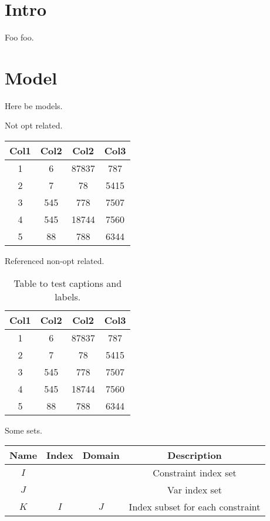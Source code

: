 \documentclass{article}
\begin{document}
\section{Intro}
Foo foo.

\section{Model}
Here be models.

Not opt related.
\begin{center}
    \begin{tabular}{||c c c c||} 
     \hline
     Col1 & Col2 & Col2 & Col3 \\ [0.5ex] 
     \hline\hline
     1 & 6 & 87837 & 787 \\ 
     \hline
     2 & 7 & 78 & 5415 \\
     \hline
     3 & 545 & 778 & 7507 \\
     \hline
     4 & 545 & 18744 & 7560 \\
     \hline
     5 & 88 & 788 & 6344 \\ [1ex] 
     \hline
    \end{tabular}
\end{center}

Referenced non-opt related.
\begin{table}[h!]
    \centering
    \begin{tabular}{||c c c c||} 
     \hline
     Col1 & Col2 & Col2 & Col3 \\ [0.5ex] 
     \hline\hline
     1 & 6 & 87837 & 787 \\ 
     2 & 7 & 78 & 5415 \\
     3 & 545 & 778 & 7507 \\
     4 & 545 & 18744 & 7560 \\
     5 & 88 & 788 & 6344 \\ [1ex] 
     \hline
    \end{tabular}
    \caption{Table to test captions and labels.}
    \label{table:1}
\end{table}

Some sets.
\begin{tabular}{c|c|c|c} \label{tab:set}
    Name & Index & Domain & Description \\
    \hline
    $I$ & & & Constraint index set \\
    $J$ & & & Var index set \\
    $K$ & $I$ & $J$ & Index subset for each constraint \\
\end{tabular}
\end{document}
